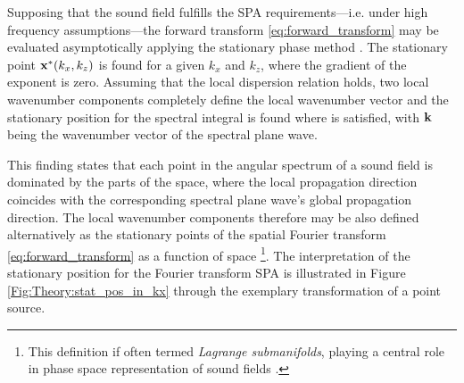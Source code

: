 Supposing that the sound field fulfills the SPA requirements---i.e. under high frequency assumptions---the forward transform \eqref{eq:forward_transform}
may be evaluated asymptotically applying the stationary phase method \cite{Arnold1995, Tinkelman2005}.
The stationary point $\mathbf{x}^*(k_x,k_z)$ is found for a given $k_x$ and $k_z$, where the gradient of the exponent is zero.
Assuming that the local dispersion relation holds, two local wavenumber components completely define the local wavenumber vector and the stationary position for the spectral integral is found where
is satisfied, with $\mathbf{k}$ being the wavenumber vector of the spectral plane wave.

This finding states that each point in the angular spectrum of a sound field is dominated by the parts of the space, where the local propagation direction coincides with the corresponding spectral plane wave's global propagation direction.
The local wavenumber components therefore may be also defined alternatively as the stationary points of the spatial Fourier transform \eqref{eq:forward_transform} as a function of space \footnote{This definition if often termed \emph{Lagrange submanifolds}, playing a central role in phase space representation of sound fields \cite{Arnold1995, Tinkelman2005, Steinberg1993}.}.
The interpretation of the stationary position for the Fourier transform SPA is illustrated in Figure \ref{Fig:Theory:stat_pos_in_kx} through the exemplary transformation of a point source.

